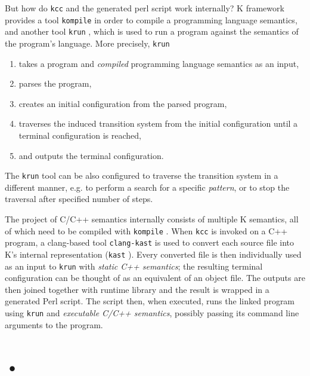 \documentclass{fithesis3}
\newcommand{\kcc}{\texttt{kcc} }
\newcommand{\kast}{\texttt{kast} }
\newcommand{\krun}{\texttt{krun} }
\newcommand{\kompile}{\texttt{kompile} }
\newcommand{\clangKast}{\texttt{clang-kast} }
\begin{document}
But how do \kcc and the generated perl script work internally? K framework provides a tool \kompile in order to compile a programming language semantics, and another tool \krun, which is used to run a program against the semantics of the program's language. More precisely, \krun 
\begin{enumerate}
\item takes a program and \textit{compiled} programming language semantics as an input,
\item parses the program,
\item creates an initial configuration from the parsed program,
\item traverses the induced transition system from the initial configuration until a terminal configuration is reached,
\item and outputs the terminal configuration.
\end{enumerate}
The \krun tool can be also configured to traverse the transition system in a different manner, e.g. to perform a search for a specific \textit{pattern}, or to stop the traversal after specified number of steps.

The project of C/C++ semantics internally consists of multiple K semantics, all of which need to be compiled with \kompile. When \kcc is invoked on a C++ program, a clang-based tool \clangKast is used to convert each source file into K's internal representation (\kast). Every converted file is then individually used as an input to \krun with \textit{static C++ semantics}; the resulting terminal configuration can be thought of as an equivalent of an object file. The outputs are then joined together with runtime library and the result is wrapped in a generated Perl script. The script then, when executed, runs the linked program using \krun and \textit{executable C/C++ semantics}, possibly passing its command line arguments to the program.




\section{•}
\end{document}
